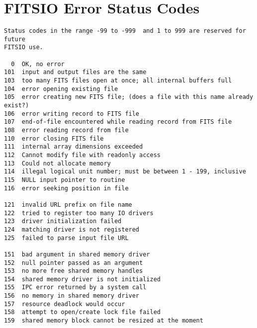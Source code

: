 \documentclass[11pt]{book}
\begin{document}
\chapter{   FITSIO Error Status Codes }

\begin{verbatim}
Status codes in the range -99 to -999  and 1 to 999 are reserved for future
FITSIO use.

  0  OK, no error
101  input and output files are the same
103  too many FITS files open at once; all internal buffers full
104  error opening existing file
105  error creating new FITS file; (does a file with this name already exist?)
106  error writing record to FITS file
107  end-of-file encountered while reading record from FITS file
108  error reading record from file
110  error closing FITS file
111  internal array dimensions exceeded
112  Cannot modify file with readonly access
113  Could not allocate memory
114  illegal logical unit number; must be between 1 - 199, inclusive
115  NULL input pointer to routine
116  error seeking position in file

121  invalid URL prefix on file name
122  tried to register too many IO drivers
123  driver initialization failed
124  matching driver is not registered
125  failed to parse input file URL

151  bad argument in shared memory driver
152  null pointer passed as an argument
153  no more free shared memory handles
154  shared memory driver is not initialized
155  IPC error returned by a system call
156  no memory in shared memory driver
157  resource deadlock would occur
158  attempt to open/create lock file failed
159  shared memory block cannot be resized at the moment



\end{verbatim}
\end{document}
